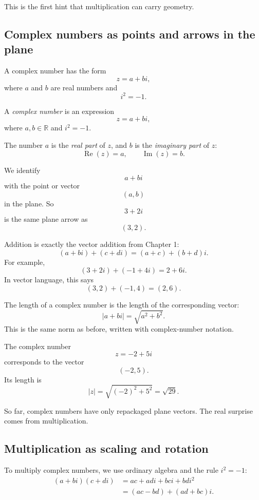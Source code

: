 This is the first hint that multiplication can carry geometry.

\subsection{Complex numbers as points and arrows in the plane}

A complex number has the form
\[
    z=a+bi,
\]
where \(a\) and \(b\) are real numbers and
\[
    i^2=-1.
\]

\begin{definition}
A \emph{complex number} is an expression
\[
    z=a+bi,
\]
where \(a,b\in\mathbb R\) and \(i^2=-1\).

The number \(a\) is the \emph{real part} of \(z\), and \(b\) is the \emph{imaginary part}
of \(z\):
\[
    \operatorname{Re}(z)=a,\qquad \operatorname{Im}(z)=b.
\]
\end{definition}

We identify
\[
    a+bi
\]
with the point or vector
\[
    (a,b)
\]
in the plane.  So
\[
    3+2i
\]
is the same plane arrow as
\[
    (3,2).
\]

Addition is exactly the vector addition from Chapter 1:
\[
    (a+bi)+(c+di)=(a+c)+(b+d)i.
\]
For example,
\[
    (3+2i)+(-1+4i)=2+6i.
\]
In vector language, this says
\[
    (3,2)+(-1,4)=(2,6).
\]

The length of a complex number is the length of the corresponding vector:
\[
    |a+bi|=\sqrt{a^2+b^2}.
\]
This is the same norm as before, written with complex-number notation.

\begin{example}
The complex number
\[
    z=-2+5i
\]
corresponds to the vector
\[
    (-2,5).
\]
Its length is
\[
    |z|=\sqrt{(-2)^2+5^2}=\sqrt{29}.
\]
\end{example}

So far, complex numbers have only repackaged plane vectors.  The real surprise comes
from multiplication.

\subsection{Multiplication as scaling and rotation}

To multiply complex numbers, we use ordinary algebra and the rule \(i^2=-1\):
\[
\begin{aligned}
    (a+bi)(c+di)
    &=ac+adi+bci+bdi^2  \\
    &=(ac-bd)+(ad+bc)i.
\end{aligned}
\]

